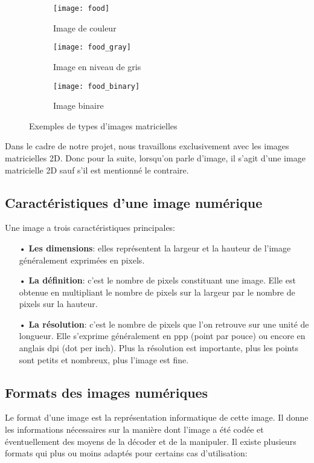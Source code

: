     \begin{figure}[H]
        \begin{subfigure}{0.3\textwidth}
            \centering
            \texttt{[image: food]}
            \caption{Image de couleur}
        \end{subfigure}
        \hfill
        \begin{subfigure}{0.3\textwidth}
            \centering
            \texttt{[image: food\_gray]}
            \caption{Image en niveau de gris}
        \end{subfigure}
        \hfill
        \begin{subfigure}{0.3\textwidth}
            \centering
            \texttt{[image: food\_binary]}
            \caption{Image binaire}
        \end{subfigure}
        \caption{Exemples de types d'images matricielles}
    \end{figure}
	Dans le cadre de notre projet, nous travaillons exclusivement avec les images matricielles 2D. Donc pour la suite, lorsqu’on parle d’image, il s'agit d’une image matricielle 2D sauf s’il est mentionné le contraire. 
    \subsection{Caractéristiques d'une image numérique}
    Une image a trois caractéristiques principales:
    \begin{itemize}
        \item[•]\textbf{Les dimensions}: elles représentent la largeur et la hauteur de l’image généralement exprimées en pixels.
        \item[•]\textbf{La définition}: c’est le nombre de pixels constituant une image. Elle est obtenue en multipliant le nombre de pixels sur la largeur par le nombre de pixels sur la hauteur.
        \item[•]\textbf{La résolution}: c’est le nombre de pixels que l’on retrouve sur une unité de longueur. Elle s’exprime généralement en ppp (point par pouce) ou encore en anglais dpi (dot per inch).  Plus la résolution est importante, plus les points sont petits et nombreux, plus l’image est fine.
    \end{itemize}

    \subsection{Formats des images numériques}
    Le format d’une image est la représentation informatique de cette image. Il donne les informations nécessaires sur la manière dont l’image a été codée et éventuellement des moyens de la décoder et de la manipuler. Il existe plusieurs formats qui plus ou moins adaptés pour certains cas d’utilisation:

